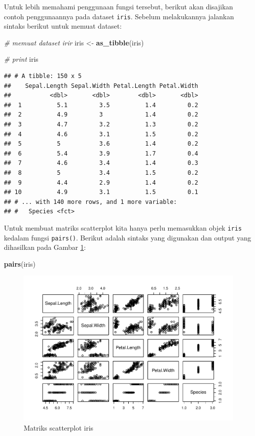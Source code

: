 \documentclass[]{book}
\newenvironment{Shaded}{\begin{snugshade}}{\end{snugshade}}
\newcommand{\KeywordTok}[1]{\textcolor[rgb]{0.13,0.29,0.53}{\textbf{#1}}}
\newcommand{\StringTok}[1]{\textcolor[rgb]{0.31,0.60,0.02}{#1}}
\newcommand{\CommentTok}[1]{\textcolor[rgb]{0.56,0.35,0.01}{\textit{#1}}}
\newcommand{\NormalTok}[1]{#1}
\begin{document}
Untuk lebih memahami penggunaan fungsi tersebut, berikut akan disajikan
contoh penggunaannya pada dataset \texttt{iris}. Sebelum melakukannya
jalankan sintaks berikut untuk memuat dataset:

\begin{Shaded}
\begin{Highlighting}[]
\CommentTok{# memuat dataset irir}
\NormalTok{iris <-}\StringTok{ }\KeywordTok{as_tibble}\NormalTok{(iris)}

\CommentTok{# print}
\NormalTok{iris}
\end{Highlighting}
\end{Shaded}

\begin{verbatim}
## # A tibble: 150 x 5
##    Sepal.Length Sepal.Width Petal.Length Petal.Width
##           <dbl>       <dbl>        <dbl>       <dbl>
##  1          5.1         3.5          1.4         0.2
##  2          4.9         3            1.4         0.2
##  3          4.7         3.2          1.3         0.2
##  4          4.6         3.1          1.5         0.2
##  5          5           3.6          1.4         0.2
##  6          5.4         3.9          1.7         0.4
##  7          4.6         3.4          1.4         0.3
##  8          5           3.4          1.5         0.2
##  9          4.4         2.9          1.4         0.2
## 10          4.9         3.1          1.5         0.1
## # ... with 140 more rows, and 1 more variable:
## #   Species <fct>
\end{verbatim}

Untuk membuat matriks scatterplot kita hanya perlu memasukkan objek
\texttt{iris} kedalam fungsi \texttt{pairs()}. Berikut adalah sintaks
yang digunakan dan output yang dihasilkan pada Gambar \ref{fig:matscat}:

\begin{Shaded}
\begin{Highlighting}[]
\KeywordTok{pairs}\NormalTok{(iris)}
\end{Highlighting}
\end{Shaded}

\begin{figure}

{\centering \includegraphics[width=0.8\linewidth]{EnvStat_files/figure-latex/matscat-1} 

}

\caption{Matriks scatterplot iris}\label{fig:matscat}
\end{figure}
\end{document}
